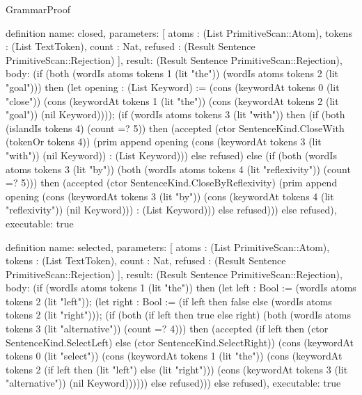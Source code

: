 \begin{lexlean}{GrammarProof}
\begin{semanticmodule}
definition{
  name: closed,
  parameters: [
    atoms : (List PrimitiveScan::Atom),
    tokens : (List TextToken),
    count : Nat,
    refused : (Result Sentence PrimitiveScan::Rejection)
  ],
  result: (Result Sentence PrimitiveScan::Rejection),
  body: (if (both (wordIs atoms tokens 1 (lit "the")) (wordIs atoms tokens 2 (lit "goal"))) then (let opening : (List Keyword) := (cons (keywordAt tokens 0 (lit "close")) (cons (keywordAt tokens 1 (lit "the")) (cons (keywordAt tokens 2 (lit "goal")) (nil Keyword)))); (if (wordIs atoms tokens 3 (lit "with")) then (if (both (islandIs tokens 4) (count =? 5)) then (accepted (ctor SentenceKind.CloseWith (tokenOr tokens 4)) (prim append opening (cons (keywordAt tokens 3 (lit "with")) (nil Keyword)) : (List Keyword))) else refused) else (if (both (wordIs atoms tokens 3 (lit "by")) (both (wordIs atoms tokens 4 (lit "reflexivity")) (count =? 5))) then (accepted (ctor SentenceKind.CloseByReflexivity) (prim append opening (cons (keywordAt tokens 3 (lit "by")) (cons (keywordAt tokens 4 (lit "reflexivity")) (nil Keyword))) : (List Keyword))) else refused))) else refused),
  executable: true
}

definition{
  name: selected,
  parameters: [
    atoms : (List PrimitiveScan::Atom),
    tokens : (List TextToken),
    count : Nat,
    refused : (Result Sentence PrimitiveScan::Rejection)
  ],
  result: (Result Sentence PrimitiveScan::Rejection),
  body: (if (wordIs atoms tokens 1 (lit "the")) then (let left : Bool := (wordIs atoms tokens 2 (lit "left")); (let right : Bool := (if left then false else (wordIs atoms tokens 2 (lit "right"))); (if (both (if left then true else right) (both (wordIs atoms tokens 3 (lit "alternative")) (count =? 4))) then (accepted (if left then (ctor SentenceKind.SelectLeft) else (ctor SentenceKind.SelectRight)) (cons (keywordAt tokens 0 (lit "select")) (cons (keywordAt tokens 1 (lit "the")) (cons (keywordAt tokens 2 (if left then (lit "left") else (lit "right"))) (cons (keywordAt tokens 3 (lit "alternative")) (nil Keyword)))))) else refused))) else refused),
  executable: true
}


\end{semanticmodule}
\end{lexlean}
